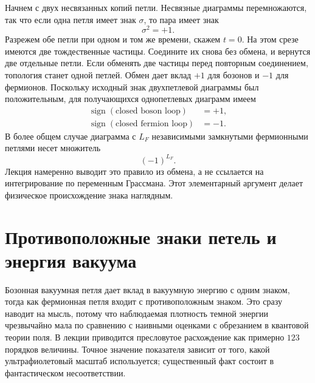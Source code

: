 Начнем с двух несвязанных копий петли. Несвязные диаграммы перемножаются, так что если одна петля имеет знак \(\sigma\), то пара имеет знак
\begin{equation}
\sigma^2=+1.
\end{equation}
Разрежем обе петли при одном и том же времени, скажем \(t=0\). На этом срезе имеются две тождественные частицы. Соедините их снова без обмена, и вернутся две отдельные петли. Если обменять две частицы перед повторным соединением, топология станет одной петлей. Обмен дает вклад \(+1\) для бозонов и \(-1\) для фермионов. Поскольку исходный знак двухпетлевой диаграммы был положительным, для получающихся однопетлевых диаграмм имеем
\begin{equation}
\begin{aligned}
\operatorname{sign}(\text{closed boson loop})&=+1,\\
\operatorname{sign}(\text{closed fermion loop})&=-1.
\end{aligned}
\end{equation}
В более общем случае диаграмма с \(L_F\) независимыми замкнутыми фермионными петлями несет множитель
\begin{equation}
(-1)^{L_F}.
\end{equation}
Лекция намеренно выводит это правило из обмена, а не ссылается на интегрирование по переменным Грассмана. Этот элементарный аргумент делает физическое происхождение знака наглядным.

\section{Противоположные знаки петель и энергия вакуума}

Бозонная вакуумная петля дает вклад в вакуумную энергию с одним знаком, тогда как фермионная петля входит с противоположным знаком. Это сразу наводит на мысль, потому что наблюдаемая плотность темной энергии чрезвычайно мала по сравнению с наивными оценками с обрезанием в квантовой теории поля. В лекции приводится пресловутое расхождение как примерно \(123\) порядков величины. Точное значение показателя зависит от того, какой ультрафиолетовый масштаб используется; существенный факт состоит в фантастическом несоответствии.

